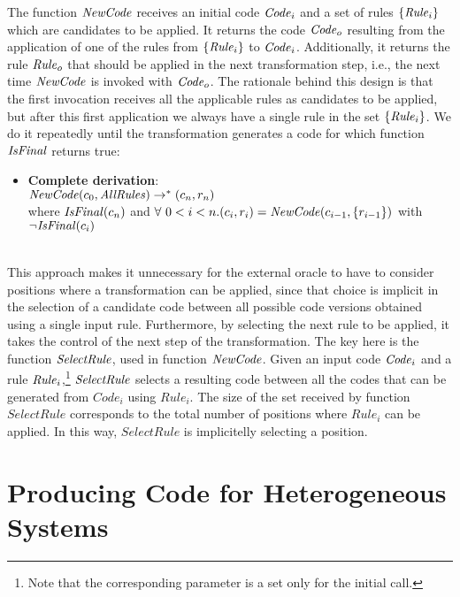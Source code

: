 \documentclass[svgnames,usenames,preprint,nocopyrightspace]{sigplanconf}
\begin{document}
The function $\mathit{NewCode}$ receives an initial code $\mathit{Code}_i$ and a set of
rules $\{\mathit{Rule}_i\}$ which are candidates to be applied. It returns the code
$\mathit{Code}_o$ resulting from the application of one of the rules from
$\{\mathit{Rule}_i\}$ to $\mathit{Code}_i$.  Additionally, it returns the rule
$\mathit{Rule}_o$ that should be applied in the next transformation step,
i.e., the next time $\mathit{NewCode}$ is invoked with $\mathit{Code}_o$.  The rationale behind this
design is that the first invocation receives all the applicable rules
as candidates to be applied, but after this first application we
always have a single rule in the set $\{\mathit{Rule}_i\}$. We do it
repeatedly until the transformation generates a code for which function $\mathit{IsFinal}$ returns true:

\newcommand{\AllRules}{\mathit{AllRules}}

\begin{itemize}
\item \textbf{Complete derivation}:\\
$\NewCode(c_0, \AllRules) \rightarrow^* (c_n,r_n)$\\
  where $\mathit{IsFinal}(c_n)$ and $\forall~ 0 < i < n.\\(c_i, r_i) =
        \mathit{NewCode}(c_{i -1}, \{r_{i -1}\})$ with $\neg \mathit{IsFinal}(c_i)$\\\\
\end{itemize} 

This approach makes it unnecessary for the external oracle to have to
consider positions where a transformation can be applied, since that
choice is implicit in the selection of a candidate code between all
possible code versions obtained using a single input rule. Furthermore,
by selecting the next rule to be applied, it takes the control of the
next step of the transformation. The key here is the function
$\mathit{SelectRule}$, used in function $\mathit{NewCode}$.  Given an input
code $\mathit{Code}_i$ and a rule $\mathit{Rule}_i$,\footnote{Note that the corresponding
parameter  is a set only for the initial call.} $\mathit{SelectRule}$ selects
a resulting code between all the codes that can be 
generated from $Code_i$ using $Rule_i$. The size of the set received
by function $SelectRule$ corresponds to the total number of positions
where $Rule_i$ can be applied. In this way, $SelectRule$ is
implicitelly selecting a position.








\section{Producing Code for Heterogeneous Systems}
\label{sec:translation}
\end{document}
